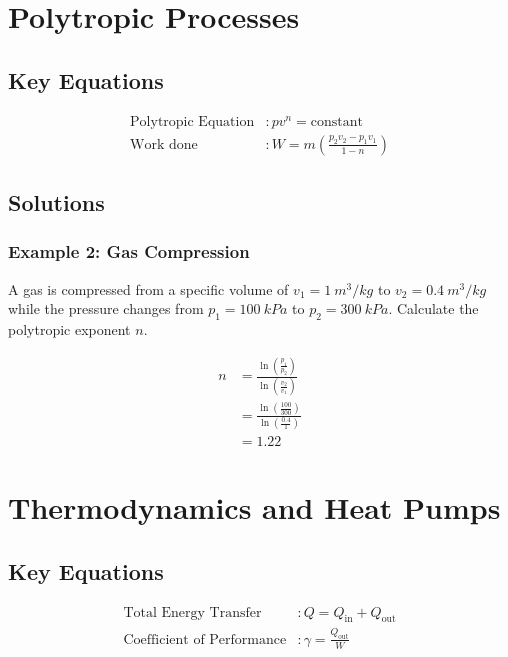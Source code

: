 \documentclass{article}
\begin{document}
\section*{Polytropic Processes}

\subsection*{Key Equations}

\begin{align*}
    \text{Polytropic Equation} &: pv^n = \text{constant} \\
    \text{Work done} &: W = m \left( \frac{p_2v_2 - p_1v_1}{1-n} \right)
\end{align*}

\subsection*{Solutions}

\subsubsection*{Example 2: Gas Compression}

A gas is compressed from a specific volume of \(v_1 = \SI{1}{m^3/kg}\) to \(v_2 = \SI{0.4}{m^3/kg}\) while the pressure changes from \(p_1 = \SI{100}{kPa}\) to \(p_2 = \SI{300}{kPa}\). Calculate the polytropic exponent \(n\).

\begin{align*}
    n &= \frac{\ln\left(\frac{p_1}{p_2}\right)}{\ln\left(\frac{v_2}{v_1}\right)} \\
    &= \frac{\ln\left(\frac{100}{300}\right)}{\ln\left(\frac{0.4}{1}\right)} \\
    &= \SI{1.22}{}
\end{align*}

\section*{Thermodynamics and Heat Pumps}

\subsection*{Key Equations}

\begin{align*}
    \text{Total Energy Transfer} & : Q = Q_{\text{in}} + Q_{\text{out}} \\
    \text{Coefficient of Performance} & : \gamma = \frac{Q_{\text{out}}}{W}
\end{align*}
\end{document}

